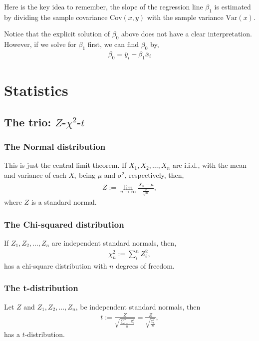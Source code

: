 \documentclass{amsart}
\theoremstyle{plain}
\numberwithin{equation}{section}
\begin{document}
Here is the key idea to remember, the slope of the regression line $\beta_1$ 
is estimated by dividing the sample covariance $\mathrm{Cov}(x,y)$ with the 
sample variance $\mathrm{Var}(x)$.

Notice that the explicit solution of $\beta_0$ above does not 
have a clear interpretation. However, if we solve for $\beta_1$ first, 
we can find $\beta_0$ by,
\begin{align*}
\beta_0 = \overline{y}_i - \beta_1 \overline{x}_i
\end{align*}

\section{Statistics}

\subsection{The trio: $Z$-$\chi^2$-$t$}
\subsubsection[The Normal distribution]{The Normal distribution}
This is just the central limit theorem. If 
$X_1, X_2, \ldots, X_n$ are i.i.d., with the 
mean and variance of each $X_i$ being $\mu$ and 
$\sigma^2$, respectively, then,
\begin{align*}
Z := \lim_{n \to \infty} \frac{\overline{X}_n-\mu}{\frac{\sigma}{\sqrt{n}}},
\end{align*}
where $Z$ is a standard normal. 
\subsubsection[The Chi-squared distribution]{The Chi-squared distribution}
If $Z_1, Z_2, \ldots, Z_n$ are independent standard normals,
then, 
\begin{align*}
\chi^2_n := \sum_{i}^{n} Z_i ^2,
\end{align*}
has a chi-square distribution with $n$ degrees of freedom.

\subsubsection[The t-distribution]{The t-distribution}
Let $Z$ and $Z_1, Z_2, \ldots, Z_n$, be independent
standard normals, then
\begin{align*}
t := \frac{Z}{\sqrt{\frac{\sum_{i=1}^{n} Z_i ^2}{n}}}
= \frac{Z}{\sqrt{\frac{\chi^2_n}{n}}},
\end{align*}
has a $t$-distribution. 
\end{document}
